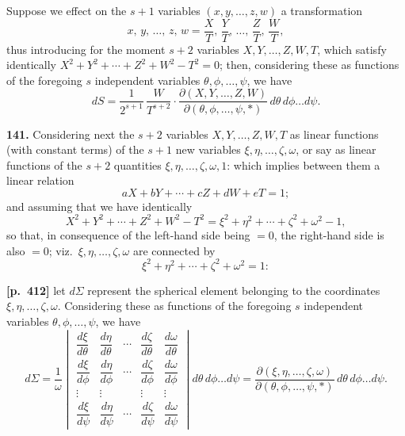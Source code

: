 \documentclass[11pt,a4paper]{article}
\begin{document}
Suppose we effect on the $s+1$ variables $(x,y,\ldots,z,w)$ a transformation
\[
x,\,y,\,\ldots,\,z,\,w = \frac{X}{T},\,\frac{Y}{T},\,\ldots,\,\frac{Z}{T},\,\frac{W}{T},
\]
thus introducing for the moment $s+2$ variables $X,Y,\ldots,Z,W,T$, which satisfy identically $X^{2}+Y^{2}+\cdots+Z^{2}+W^{2}-T^{2} = 0$; then, considering these as functions of the foregoing $s$ independent variables $\theta,\phi,\ldots,\psi$, we have
\[
dS = \frac{1}{2^{s+1}}\,\frac{W}{T^{s+2}}\cdot\frac{\partial(X,Y,\ldots,Z,W)}{\partial(\theta,\phi,\ldots,\psi,*)}\,d\theta\,d\phi\ldots d\psi.
\]

\textbf{141.} Considering next the $s+2$ variables $X,Y,\ldots,Z,W,T$ as linear functions (with constant terms) of the $s+1$ new variables $\xi,\eta,\ldots,\zeta,\omega$, or say as linear functions of the $s+2$ quantities $\xi,\eta,\ldots,\zeta,\omega,1$: which implies between them a linear relation
\[
aX + bY + \cdots + cZ + dW + eT = 1;
\]
and assuming that we have identically
\[
X^{2}+Y^{2}+\cdots+Z^{2}+W^{2}-T^{2} = \xi^{2}+\eta^{2}+\cdots+\zeta^{2}+\omega^{2}-1,
\]
so that, in consequence of the left-hand side being $=0$, the right-hand side is also $=0$; viz.\ $\xi,\eta,\ldots,\zeta,\omega$ are connected by
\[
\xi^{2}+\eta^{2}+\cdots+\zeta^{2}+\omega^{2} = 1:
\]

\bigskip
\noindent\textbf{[p.~412]}\quad
let $d\Sigma$ represent the spherical element belonging to the coordinates $\xi,\eta,\ldots,\zeta,\omega$. Considering these as functions of the foregoing $s$ independent variables $\theta,\phi,\ldots,\psi$, we have
\[
d\Sigma = \frac{1}{\omega}\begin{vmatrix}
\dfrac{d\xi}{d\theta} & \dfrac{d\eta}{d\theta} & \cdots & \dfrac{d\zeta}{d\theta} & \dfrac{d\omega}{d\theta}\\[4pt]
\dfrac{d\xi}{d\phi} & \dfrac{d\eta}{d\phi} & \cdots & \dfrac{d\zeta}{d\phi} & \dfrac{d\omega}{d\phi}\\[4pt]
\vdots & \vdots & & \vdots & \vdots\\
\dfrac{d\xi}{d\psi} & \dfrac{d\eta}{d\psi} & \cdots & \dfrac{d\zeta}{d\psi} & \dfrac{d\omega}{d\psi}
\end{vmatrix}d\theta\,d\phi\ldots d\psi
= \frac{\partial(\xi,\eta,\ldots,\zeta,\omega)}{\partial(\theta,\phi,\ldots,\psi,*)}\,d\theta\,d\phi\ldots d\psi.
\]
\end{document}
